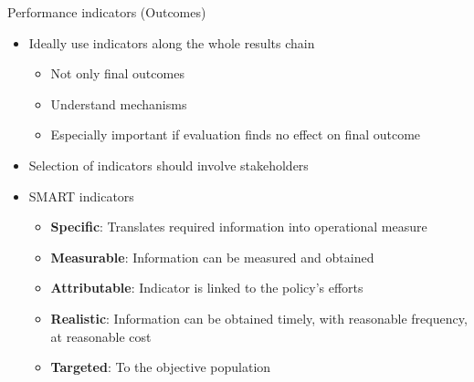 \documentclass[
  ignorenonframetext,
]{beamer}
\providecommand{\tightlist}{%
  \setlength{\itemsep}{0pt}\setlength{\parskip}{0pt}}
\begin{document}
\begin{frame}{Performance indicators (Outcomes)}
\label{performance-indicators-outcomes}
\begin{itemize}
\tightlist
\item
  Ideally use indicators along the whole results chain

  \begin{itemize}
  \tightlist
  \item
    Not only final outcomes\\
  \item
    Understand mechanisms\\
  \item
    Especially important if evaluation finds no effect on final
    outcome\\
  \end{itemize}
\item
  Selection of indicators should involve stakeholders\\
\item
  SMART indicators

  \begin{itemize}
  \tightlist
  \item
    \textbf{Specific}: Translates required information into operational
    measure\\
  \item
    \textbf{Measurable}: Information can be measured and obtained\\
  \item
    \textbf{Attributable}: Indicator is linked to the policy's efforts\\
  \item
    \textbf{Realistic}: Information can be obtained timely, with
    reasonable frequency, at reasonable cost\\
  \item
    \textbf{Targeted}: To the objective population
  \end{itemize}
\end{itemize}
\end{frame}
\end{document}
